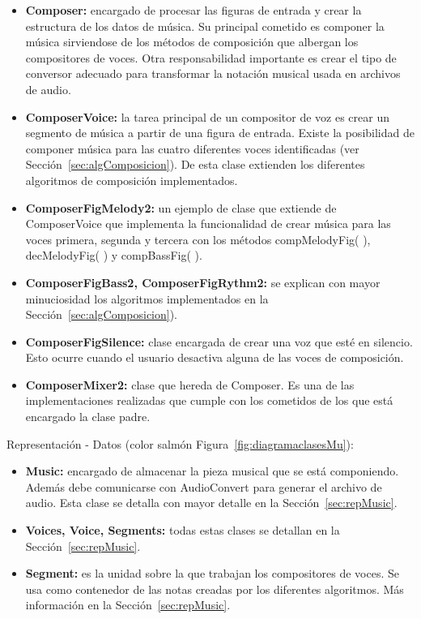 \begin{itemize}
	
	\item \textbf{Composer:} encargado de procesar las figuras de entrada y crear la estructura de los datos de música. Su principal cometido es componer la música sirviendose de los métodos de composición que albergan los compositores de voces. Otra responsabilidad importante es crear el tipo de conversor adecuado para transformar la notación musical usada en archivos de audio.

	\item \textbf{ComposerVoice:} la tarea principal de un compositor de voz es crear un segmento de música a partir de una figura de entrada. Existe la posibilidad de componer música para las cuatro diferentes voces identificadas (ver Sección~\ref{sec:algComposicion}). De esta clase extienden los diferentes algoritmos de composición implementados.

	\item \textbf{ComposerFigMelody2:} un ejemplo de clase que extiende de ComposerVoice que implementa la funcionalidad de crear música para las voces primera, segunda y tercera con los métodos compMelodyFig( ), decMelodyFig( ) y compBassFig( ).

	\item \textbf{ComposerFigBass2, ComposerFigRythm2:} se explican con mayor minuciosidad los algoritmos implementados en la Sección~\ref{sec:algComposicion}).

	\item \textbf{ComposerFigSilence:} clase encargada de crear una voz que esté en silencio. Esto ocurre cuando el usuario desactiva alguna de las voces de composición.

	\item \textbf{ComposerMixer2:} clase que hereda de Composer. Es una de las implementaciones realizadas que cumple con los cometidos de los que está encargado la clase padre.

\end{itemize}

Representación - Datos (color salmón Figura~\ref{fig:diagramaclasesMu}):

\begin{itemize}
	
	\item \textbf{Music:} encargado de almacenar la pieza musical que se está componiendo. Además debe comunicarse con AudioConvert para generar el archivo de audio. Esta clase se detalla con mayor detalle en la Sección~\ref{sec:repMusic}.

	\item \textbf{Voices, Voice, Segments:} todas estas clases se detallan en la Sección~\ref{sec:repMusic}.

	\item \textbf{Segment:} es la unidad sobre la que trabajan los compositores de voces. Se usa como contenedor de las notas creadas por los diferentes algoritmos. Más información en la Sección~\ref{sec:repMusic}.

\end{itemize}

